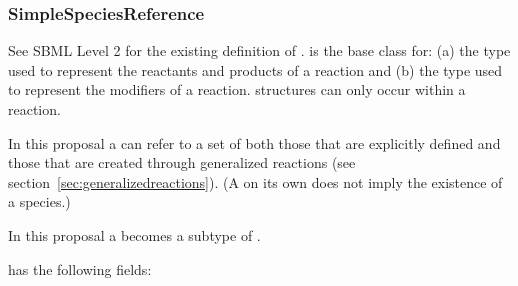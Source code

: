 \documentclass{cekarticle}
\begin{document}
\subsubsection{SimpleSpeciesReference}

See SBML Level 2 for the existing definition of .
 is the base class for: (a)  the type used
to represent the reactants and products of a reaction and (b)  the
type used to represent the modifiers of a reaction.   structures
can only occur within a reaction.

In this proposal a  can refer to a
set of  both those that are explicitly defined and
those that are created through generalized reactions (see
section~\ref{sec:generalizedreactions}).  (A
 on its own does not imply the
existence of a species.)

In this proposal a  becomes a subtype of .

 has the following fields:
\end{document}
